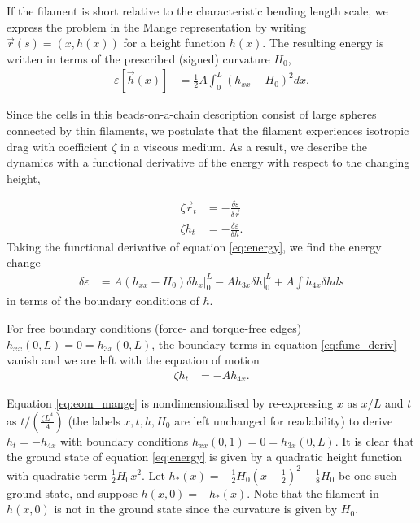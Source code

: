 If the filament is short relative to the characteristic bending length scale, we express the problem in the Mange representation by writing $\vec{r}(s) = (x, h(x))$ for a height function $h(x)$. 
The resulting energy is written in terms of the prescribed (signed) curvature $H_0$, 
\begin{align}
    \varepsilon[\vec{h}(x)] &= \frac{1}{2} A \int_0^L (h_{xx} - H_0)^2 dx. \label{eq:energy}
\end{align}

Since the cells in this beads-on-a-chain description consist of large spheres connected by thin filaments, we postulate that the filament experiences isotropic drag with coefficient $\zeta$ in a viscous medium.
As a result, we describe the dynamics with a functional derivative of the energy with respect to the changing height,

\begin{align}
    \zeta \vec{r}_t &= -\frac{\delta \varepsilon}{\delta \vec{r}} \nonumber \\
    \zeta h_t &= -\frac{\delta \varepsilon}{\delta h}. \label{eq:eom} 
\end{align}
Taking the functional derivative of equation \ref{eq:energy}, we find the energy change
\begin{align}
    \delta \varepsilon &= \left. A(h_{xx} - H_0)\delta h_x \right|_0^L - \left. Ah_{3x} \delta h \right|_0^L + A \int h_{4x} \delta h ds \label{eq:func_deriv} 
\end{align}
in terms of the boundary conditions of $h$.

For free boundary conditions (force- and torque-free edges) $h_{xx}(0, L) = 0 = h_{3x}(0, L)$, the boundary terms in equation \ref{eq:func_deriv} vanish and we are left with the equation of motion 
\begin{align}
    \zeta h_t &= -A h_{4x}. \label{eq:eom_mange}
\end{align}

Equation \ref{eq:eom_mange} is nondimensionalised by re-expressing $x$ as $x/L$ and $t$ as $t / (\frac{\zeta L^4}{A})$ (the labels $x, t, h, H_0$ are left unchanged for readability) to derive $h_t = -h_{4x}$ with boundary conditions $h_{xx}(0, 1) = 0 = h_{3x}(0, L)$. 
It is clear that the ground state of equation \ref{eq:energy} is given by a quadratic height function with quadratic term $\frac{1}{2}H_0x^2$. 
Let $h_*(x) = -\frac{1}{2} H_0(x-\frac{1}{2})^2 + \frac{1}{8}H_0$ be one such ground state, and suppose $h(x, 0) = -h_*(x)$. Note that the filament in $h(x, 0)$ is not in the ground state since the curvature is given by $H_0$. 

